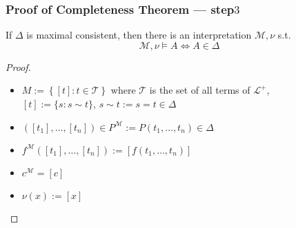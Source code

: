 \documentclass[UTF8,aspectratio=43,11pt,colorlinks,compress,openany]{beamer}%
\begin{document}
\begin{frame}\frametitle{Proof of Completeness Theorem --- step$3$}
	\begin{lemma}
		If $\Delta$ is maximal consistent, then there is an interpretation $\mathcal{M},\nu$ s.t.
		\[\mathcal{M},\nu\vDash A\iff A\in\Delta\]
	\end{lemma}
	\begin{proof}
		\begin{itemize}
			\item $M:=\left\{[t]: t\in\mathcal{T}\right\}$ where $\mathcal{T}$ is the set of all terms of $\mathscr{L}^+$,\\
			$[t]:=\{s: s\sim t\}$, $s\sim t:=s=t\in\Delta$
			\item $\left([t_1],\dots,[t_n]\right)\in P^{\mathcal{M}}:=P\left(t_1,\dots,t_n\right)\in\Delta$
			\item $f^{\mathcal{M}}\left([t_1],\dots,[t_n]\right):=[f(t_1,\dots,t_n)]$
			\item $c^{\mathcal{M}}=[c]$
			\item $\nu(x):=[x]$
		\end{itemize}
	\end{proof}
\end{frame}
\end{document}
